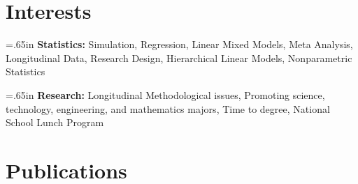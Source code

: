 \documentclass[]{friggeri-cv} %
\begin{document}

\newpage 
\section{Interests}

\hangindent=.65in \textbf{Statistics:} Simulation, Regression, Linear Mixed Models, Meta Analysis, Longitudinal Data, Research Design, Hierarchical Linear Models, Nonparametric Statistics 

\hangindent=.65in \textbf{Research:} Longitudinal Methodological issues, Promoting science, technology, engineering, and mathematics majors, Time to degree, National School Lunch Program

\section{Publications}

\begin{refsection} %
\nocite{*}
\printbibliography[sorting=chronological, type = article, keyword = {In Press}, title = {Published Article}, heading=subbibliography]
\printbibliography[sorting=chronological, type=article, title={Published Articles}, notkeyword = {In Press}, notkeyword={In Prep}, heading=none]
\end{refsection} 

\end{document}
